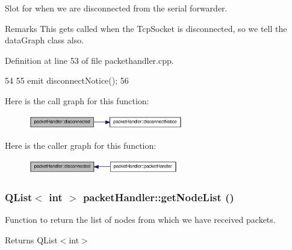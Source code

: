 Slot for when we are disconnected from the serial forwarder. 

\begin{DoxyRemark}{Remarks}
This gets called when the TcpSocket is disconnected, so we tell the dataGraph class also. 
\end{DoxyRemark}


Definition at line 53 of file packethandler.cpp.




\begin{DoxyCode}
54 {
55     emit disconnectNotice();
56 }
\end{DoxyCode}




Here is the call graph for this function:\nopagebreak
\begin{figure}[H]
\begin{center}
\leavevmode
\includegraphics[width=191pt]{classpacketHandler_a43223a8930a6af8c40c5889d8e4b9d4b_cgraph}
\end{center}
\end{figure}




Here is the caller graph for this function:\nopagebreak
\begin{figure}[H]
\begin{center}
\leavevmode
\includegraphics[width=185pt]{classpacketHandler_a43223a8930a6af8c40c5889d8e4b9d4b_icgraph}
\end{center}
\end{figure}


\hypertarget{classpacketHandler_a7d07166d577b014234ad311599ac3291}{
\subsubsection[{getNodeList}]{\setlength{\rightskip}{0pt plus 5cm}QList$<$ int $>$ packetHandler::getNodeList ()}}
\label{classpacketHandler_a7d07166d577b014234ad311599ac3291}
Function to return the list of nodes from which we have received packets. \begin{DoxyReturn}{Returns}
QList$<$int$>$ 
\end{DoxyReturn}


